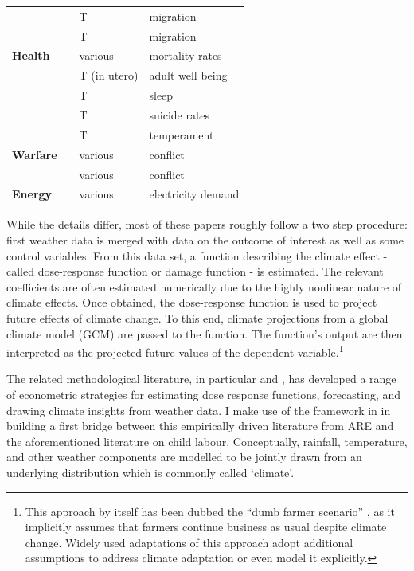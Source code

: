 \documentclass[a4paper,12pt]{article}
\theoremstyle{plain}
\theoremstyle{definition}
\theoremstyle{definition}
\theoremstyle{definition}
\theoremstyle{definition}
\begin{document}
\begin{table}[t!]
\begin{tabular}{|p{2.8cm}|p{6cm}|p{2.2cm}|p{3.5cm}| }
    \ \ & \citet{Cattaneo2016}& T & migration\\
    \ \ & \citet{Missirian2017}& T & migration\\    
    \hline
    \textbf{Health} & \citet{Deschenes2014} & various & mortality rates\\
    \ \ & \citet{Isen2017} & T (in utero) & adult well being\\
    \ \ & \citet{Obradovich2017} & T & sleep\\
    \ \ & \citet{Burke2018} & T & suicide rates\\
    \ \ & \citet{Baylis2020} & T & temperament\\
    \hline
    \textbf{Warfare} & \citet{Hsiang2011} & various & conflict\\
    \ \ & \citet{Burke2015} & various & conflict\\
    \hline
    \textbf{Energy} & \citet{Auffhammer2014} & various & electricity demand\\
    \hline
    \end{tabular}
    \label{tab:ARE_lit}
\end{table}

While the details differ, most of these papers roughly follow a two step procedure: first weather data is merged with data on the outcome of interest as well as some control variables. From this data set, a function describing the climate effect - called dose-response function or damage function - is estimated. The relevant coefficients are often estimated numerically due to the highly nonlinear nature of climate effects. Once obtained, the dose-response function is used to project future effects of climate change. To this end, climate projections from a global climate model (GCM) are passed to the function. The function's output are then interpreted as the projected future values of the dependent variable.\footnote{This approach by itself has been dubbed the ``dumb farmer scenario'' \citep{Auffhammer2014a}, as it implicitly assumes that farmers continue business as usual despite climate change. Widely used adaptations of this approach adopt additional assumptions to address climate adaptation or even model it explicitly.}

The related methodological literature, in particular \citet{Timmins2009, Schlenker2010a, Auffhammer2013, Hansen2014, Auffhammer2018} and \citet{Hsiang2016a}, has developed a range of econometric strategies for estimating dose response functions, forecasting, and drawing climate insights from weather data. I make use of the framework in \citet{Hsiang2016a} in building a first bridge between this empirically driven literature from ARE and the aforementioned literature on child labour. Conceptually, rainfall, temperature, and other weather components are modelled to be jointly drawn from an underlying distribution which is commonly called `climate'. 
\end{document}
